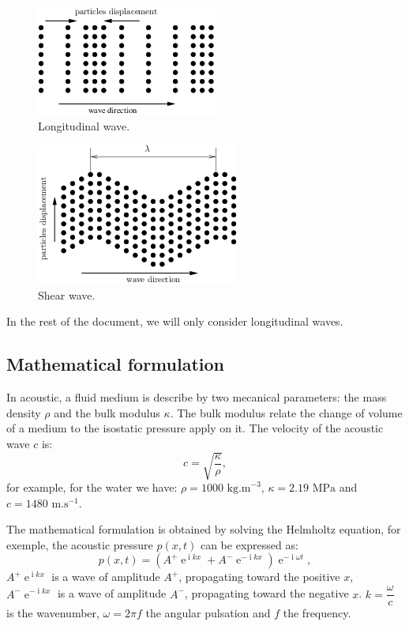\documentclass[a4paper,twoside,11pt]{article}
\DeclareMathOperator{\im}{i} %
\DeclareMathOperator{\e}{e} %
\begin{document}
\begin{figure}[htb]
	\centering
		\includegraphics{image/Pwave}
	\caption{Longitudinal wave.}
	\label{fig:Pwave}
\end{figure}
\begin{figure}[htb]
	\centering
		\includegraphics{image/Swave}
	\caption{Shear wave.}
	\label{fig:Swave}
\end{figure}

In the rest of the document, we will only consider longitudinal waves.

\FloatBarrier

\subsection{Mathematical formulation}
\label{sec/Mathematical formulation}

In acoustic, a fluid medium is describe by two mecanical parameters: the mass 
density 
$\rho$ and the bulk modulus $\kappa$. The bulk modulus relate the change of 
volume of a medium to the isostatic pressure apply on it. The velocity of the 
acoustic wave $c$ is:
\begin{equation}
 c=\sqrt{\dfrac{\kappa}{\rho}},
 \label{eq:speed of sound}
\end{equation}
for example, for the water we have: $\rho=1000\text{ kg.m}^{-3}$, 
$\kappa=2.19\text{ MPa}$ and $c=1480\text{ m.s}^{-1}$.

The mathematical formulation is obtained by solving the Helmholtz equation, for 
exemple, the acoustic pressure $p\left(x,t\right)$ can be expressed as:
\begin{equation}
 p\left(x,t\right)=\left(A^{+}\e^{\im kx}+A^{-}\e^{-\im kx}\right)\e^{-\im 
\omega t},
 \label{eq:math 1D formulation}
\end{equation}
$A^{+}\e^{\im kx}$ is a wave of amplitude $A^{+}$, propagating toward the 
positive $x$, $A^{-}\e^{-\im kx}$ is a wave of amplitude $A^{-}$, propagating 
toward the negative $x$. $k=\dfrac{\omega}{c}$ is the wavenumber, $\omega=2\pi 
f$ the angular pulsation and $f$ the frequency.
\end{document}
